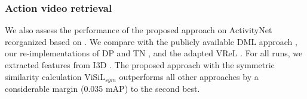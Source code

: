 \documentclass[10pt,twocolumn,letterpaper]{article}
\begin{document}
\subsubsection{Action video retrieval}
\label{sec:avr}

We also assess the performance of the proposed approach on ActivityNet \cite{caba2015} reorganized based on \cite{feng2018}. We compare with the publicly available DML approach  \cite{kordopatis2017b}, our re-implementations of DP \cite{chou2015} and TN \cite{tan2009}, and the adapted VReL \cite{feng2018}. For all runs, we extracted features from I3D \cite{carreira2017}. The proposed approach with the symmetric similarity calculation ViSiL$_{sym}$ outperforms all other approaches by a considerable margin (0.035 mAP) to the second best. 

\begin{table}[t]
  \centering
  \caption {mAP comparison of three ViSiL setups and state-of-the-art methods on the three tasks of FIVR-200K.}
  \label{tab:fivr}
\end{table}
\end{document}
